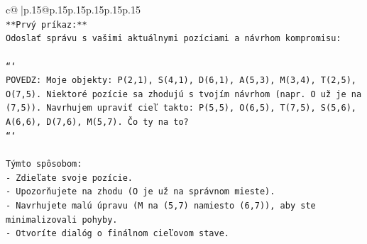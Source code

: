 \documentclass{article}
\begin{document}
{\begin{supertabular}{c@{$\;$}|p{.15\linewidth}@{}p{.15\linewidth}p{.15\linewidth}p{.15\linewidth}p{.15\linewidth}p{.15\linewidth}}
{{{\\ 
\texttt{**Prvý príkaz:**} \\
\texttt{Odoslať správu s vašimi aktuálnymi pozíciami a návrhom kompromisu:} \\
\\ 
\texttt{```} \\
\texttt{POVEDZ: Moje objekty: P(2,1), S(4,1), D(6,1), A(5,3), M(3,4), T(2,5), O(7,5). Niektoré pozície sa zhodujú s tvojím návrhom (napr. O už je na (7,5)). Navrhujem upraviť cieľ takto: P(5,5), O(6,5), T(7,5), S(5,6), A(6,6), D(7,6), M(5,7). Čo ty na to?} \\
\texttt{```} \\
\\ 
\texttt{Týmto spôsobom:} \\
\texttt{{-} Zdieľate svoje pozície.} \\
\texttt{{-} Upozorňujete na zhodu (O je už na správnom mieste).} \\
\texttt{{-} Navrhujete malú úpravu (M na (5,7) namiesto (6,7)), aby ste minimalizovali pohyby.} \\
\texttt{{-} Otvoríte dialóg o finálnom cieľovom stave.} \\
            }
        }
    }
     \\ \\


\end{supertabular}}
\end{document}
